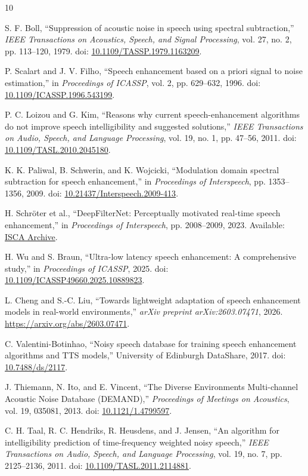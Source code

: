 \documentclass[11pt,a4paper]{article}
\begin{document}
\begin{thebibliography}{10}

S. F. Boll, ``Suppression of acoustic noise in speech using spectral subtraction,''
\emph{IEEE Transactions on Acoustics, Speech, and Signal Processing}, vol. 27,
no. 2, pp. 113--120, 1979. doi: \href{https://doi.org/10.1109/TASSP.1979.1163209}{10.1109/TASSP.1979.1163209}.

P. Scalart and J. V. Filho, ``Speech enhancement based on a priori signal to noise estimation,''
in \emph{Proceedings of ICASSP}, vol. 2, pp. 629--632, 1996.
doi: \href{https://doi.org/10.1109/ICASSP.1996.543199}{10.1109/ICASSP.1996.543199}.

P. C. Loizou and G. Kim, ``Reasons why current speech-enhancement algorithms do not improve speech intelligibility and suggested solutions,''
\emph{IEEE Transactions on Audio, Speech, and Language Processing}, vol. 19,
no. 1, pp. 47--56, 2011. doi: \href{https://doi.org/10.1109/TASL.2010.2045180}{10.1109/TASL.2010.2045180}.

K. K. Paliwal, B. Schwerin, and K. Wojcicki,
``Modulation domain spectral subtraction for speech enhancement,''
in \emph{Proceedings of Interspeech}, pp. 1353--1356, 2009.
doi: \href{https://doi.org/10.21437/Interspeech.2009-413}{10.21437/Interspeech.2009-413}.

H. Schr\"oter et al., ``DeepFilterNet: Perceptually motivated real-time speech enhancement,''
in \emph{Proceedings of Interspeech}, pp. 2008--2009, 2023.
Available: \href{https://www.isca-archive.org/interspeech_2023/schroter23b_interspeech.html}{ISCA Archive}.

H. Wu and S. Braun, ``Ultra-low latency speech enhancement: A comprehensive study,''
in \emph{Proceedings of ICASSP}, 2025.
doi: \href{https://doi.org/10.1109/ICASSP49660.2025.10889823}{10.1109/ICASSP49660.2025.10889823}.

L. Cheng and S.-C. Liu, ``Towards lightweight adaptation of speech enhancement models in real-world environments,''
\emph{arXiv preprint arXiv:2603.07471}, 2026.
\url{https://arxiv.org/abs/2603.07471}.

C. Valentini-Botinhao, ``Noisy speech database for training speech enhancement algorithms and TTS models,''
University of Edinburgh DataShare, 2017.
doi: \href{https://doi.org/10.7488/ds/2117}{10.7488/ds/2117}.

J. Thiemann, N. Ito, and E. Vincent, ``The Diverse Environments Multi-channel Acoustic Noise Database (DEMAND),''
\emph{Proceedings of Meetings on Acoustics}, vol. 19, 035081, 2013.
doi: \href{https://doi.org/10.1121/1.4799597}{10.1121/1.4799597}.

C. H. Taal, R. C. Hendriks, R. Heusdens, and J. Jensen,
``An algorithm for intelligibility prediction of time-frequency weighted noisy speech,''
\emph{IEEE Transactions on Audio, Speech, and Language Processing}, vol. 19,
no. 7, pp. 2125--2136, 2011.
doi: \href{https://doi.org/10.1109/TASL.2011.2114881}{10.1109/TASL.2011.2114881}.

\end{thebibliography}
\end{document}

